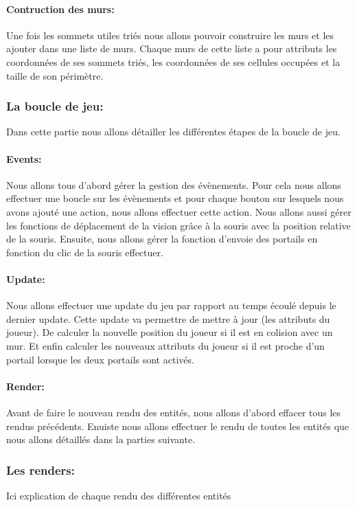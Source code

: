 \documentclass[12pt]{report}
\begin{document}
\paragraph{Contruction des murs:}
Une fois les sommets utiles triés nous allons pouvoir construire les murs et
les ajouter dans une liste de murs. Chaque murs de cette liste a pour attributs
les coordonnées de ses sommets triés, les coordonnées de ses cellules occupées et
la taille de son périmètre.

\subsubsection{La boucle de jeu:}
Dans cette partie nous allons détailler les différentes étapes de la boucle de jeu.

\paragraph{Events:}
Nous allons tous d'abord gérer la gestion des évènements. 
Pour cela nous allons effectuer une boucle sur les évènements et pour chaque
bouton sur lesquels nous avons ajouté une action, nous allons effectuer cette
action. Nous allons aussi gérer les fonctions de déplacement de la vision 
grâce à la souris avec la position relative de la souris. Ensuite, nous allons
gérer la fonction d'envoie des portails en fonction du clic de la souris effectuer.

\paragraph{Update:}
Nous allons effectuer une update du jeu par rapport au temps écoulé depuis le
dernier update. Cette update va permettre de mettre à jour (les attributs du 
joueur). De calculer la nouvelle position du joueur si il est en colision avec 
un mur. Et enfin calculer les nouveaux attributs du joueur si il est proche d'un
portail lorsque les deux portails sont activés.

\paragraph{Render:}
Avant de faire le nouveau rendu des entités, nous allons d'abord effacer 
tous les rendus précédents. Enuiste nous allons effectuer le rendu de toutes
les entités que nous allons détaillés dans la parties suivante.

\subsubsection{Les renders:}
Ici explication de chaque rendu des différentes entités
\end{document}
